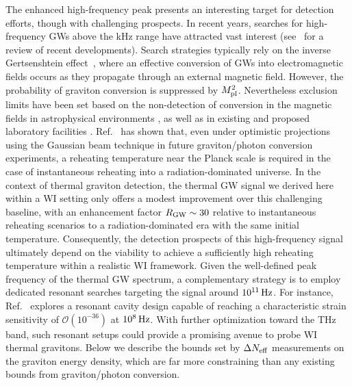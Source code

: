The enhanced high-frequency peak presents an interesting target for detection efforts, though with challenging prospects. In recent years, searches for high-frequency GWs above the kHz range have attracted vast interest (see~\cite{Aggarwal:2025noe} for a review of recent developments).   Search strategies typically rely on the inverse Gertsenshtein effect~\cite{gertsenshtein1962wave}, where an effective conversion of GWs into electromagnetic fields occurs as they propagate through an external magnetic field. However, the probability of graviton conversion is suppressed by $M^2_{\rm pl}$. Nevertheless exclusion limits have been set based on the non-detection of conversion in the magnetic fields in astrophysical environments \cite{Domcke:2020yzq, Liu:2023mll, Ito:2023fcr, Ito:2023nkq, He:2023xoh, Dandoy:2024oqg, Lella:2024dus, McDonald:2024nxj, Dunsky:2025pvd, Matsuo:2025blj}, as well as in existing and proposed laboratory facilities \cite{Ejlli:2019bqj, Domcke:2022rgu, Gao:2023gph, Domcke:2023bat, Valero:2024ncz, Domcke:2024mfu, Domcke:2024eti, Capdevilla:2024cby, Pappas:2025zld}.  Ref.~\cite{Ringwald:2020ist} has shown that, even under optimistic projections using the Gaussian beam technique in future graviton/photon conversion experiments, a reheating temperature near the Planck scale is required in the case of instantaneous reheating into a radiation-dominated universe.  In the context of thermal graviton detection,  the thermal GW signal we derived here within a WI setting only offers a modest improvement over this challenging baseline, with an enhancement factor $R_{\rm GW}\sim 30$ relative to instantaneous reheating scenarios to a radiation-dominated era with the same initial temperature. Consequently, the detection prospects of this high-frequency signal ultimately depend on the viability to achieve a sufficiently high reheating temperature within a realistic WI framework. Given the well-defined peak frequency of the thermal GW spectrum, a complementary strategy is to employ dedicated resonant searches targeting the signal around $10^{11}\,{\rm Hz}$. For instance, Ref.~\cite{Herman:2022fau} explores a resonant cavity design capable of reaching a characteristic strain sensitivity of $\mathcal{O}(10^{-36})$ at $10^{8}\,{\rm Hz}$. With further optimization toward the THz band, such resonant setups could provide a promising avenue to probe WI thermal gravitons. Below we describe the bounds set by $\Delta N_{\rm eff}$ measurements on the graviton energy density, which are far more constraining than any existing bounds from graviton/photon conversion.

